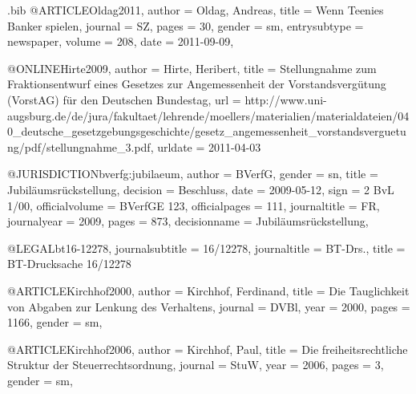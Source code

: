 \begin{filecontents}{\jobname.bib}
@ARTICLE{Oldag2011,
  author = {Oldag, Andreas},
  title = {Wenn Teenies Banker spielen},
  journal = {SZ},
  pages = {30},
  gender = {sm},
  entrysubtype = {newspaper},
  volume = {208},
  date = {2011-09-09},
}

@ONLINE{Hirte2009,
  author = {Hirte, Heribert},
  title = {Stellungnahme zum Fraktionsentwurf eines Gesetzes zur Angemessenheit
	der Vorstandsvergütung (VorstAG) für den Deutschen Bundestag},
  url = {http://www.uni-augsburg.de/de/jura/fakultaet/lehrende/moellers/materialien/materialdateien/040_deutsche_gesetzgebungsgeschichte/gesetz_angemessenheit_vorstandsverguetung/pdf/stellungnahme_3.pdf},
  urldate = {2011-04-03}
}

@JURISDICTION{bverfg:jubilaeum,
  author = {BVerfG},
  gender = {sn},
  title = {Jubiläumsrückstellung},
  decision = {Beschluss},
  date = {2009-05-12},
  sign = {2 BvL 1/00},
  officialvolume = {BVerfGE 123},
  officialpages = {111},
  journaltitle = {FR},
  journalyear = {2009},
  pages = {873},
  decisionname = {Jubiläumsrückstellung},
}

@LEGAL{bt16-12278,
  journalsubtitle = {16/12278},
  journaltitle = {BT-Drs.},
  title = {BT-Drucksache 16/12278}
}

@ARTICLE{Kirchhof2000,
  author = {Kirchhof, Ferdinand},
  title = {Die Tauglichkeit von Abgaben zur Lenkung des Verhaltens},
  journal = {DVBl},
  year = {2000},
  pages = {1166},
  gender = {sm},
}

@ARTICLE{Kirchhof2006,
  author = {Kirchhof, Paul},
  title = {Die freiheitsrechtliche Struktur der Steuerrechtsordnung},
  journal = {StuW},
  year = {2006},
  pages = {3},
  gender = {sm},
}
\end{filecontents}


\documentclass[toc=graduated,parskip=half-,DIV=13,fontsize=11pt,paper=a4]{scrartcl}

\usepackage{eurosym}	%
\usepackage{libertinus-otf} 		%
\setmonofont[Scale=MatchLowercase,FakeStretch=0.9]{AnonymousPro}
\usepackage[ngerman]{babel}
\usepackage{listings}
\lstset{basicstyle=\ttfamily}
\usepackage{dtk-logos}
\usepackage{enumitem}

\usepackage[babel,german=guillemets]{csquotes}
\usepackage[%
    uniquename=true,%
    singletitle=true,
    sorting=nyvt,%
    sortcites=true,
    maxnames=3,
    idemtracker=constrict,%
    style=biblatex-juradiss,%
    ibidtracker=false,%
    datezeros=false,%
    date=short,%
]{biblatex} 

